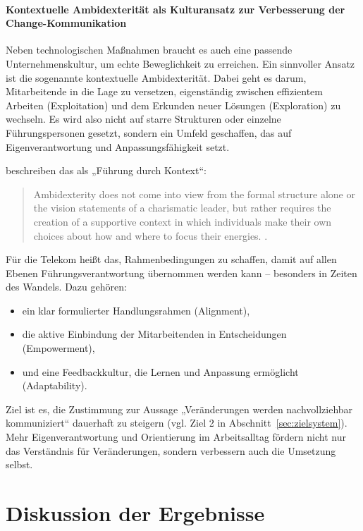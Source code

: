 \documentclass[12pt,a4paper]{article}
\begin{document}
	\paragraph{Kontextuelle Ambidexterität als Kulturansatz zur Verbesserung der Change-Kommunikation}
	
	Neben technologischen Maßnahmen braucht es auch eine passende Unternehmenskultur, um echte Beweglichkeit zu erreichen. Ein sinnvoller Ansatz ist die sogenannte kontextuelle Ambidexterität. Dabei geht es darum, Mitarbeitende in die Lage zu versetzen, eigenständig zwischen effizientem Arbeiten (Exploitation) und dem Erkunden neuer Lösungen (Exploration) zu wechseln. Es wird also nicht auf starre Strukturen oder einzelne Führungspersonen gesetzt, sondern ein Umfeld geschaffen, das auf Eigenverantwortung und Anpassungsfähigkeit setzt.
	
	\noindent\textcite{kumkale_organizational_2022} beschreiben das als „Führung durch Kontext“:
	
	\begin{quote}
		Ambidexterity does not come into view from the formal structure alone or the vision statements of a charismatic leader, but rather requires the creation of a supportive context in which individuals make their own choices about how and where to focus their energies. \parencite[18]{kumkale_organizational_2022}.
	\end{quote}
	
	\noindent Für die Telekom heißt das, Rahmenbedingungen zu schaffen, damit auf allen Ebenen Führungsverantwortung übernommen werden kann – besonders in Zeiten des Wandels. Dazu gehören:
	
	\begin{itemize}
		\item ein klar formulierter Handlungsrahmen (Alignment),
		\item die aktive Einbindung der Mitarbeitenden in Entscheidungen (Empowerment),
		\item und eine Feedbackkultur, die Lernen und Anpassung ermöglicht (Adaptability).
	\end{itemize}
	
	\noindent Ziel ist es, die Zustimmung zur Aussage „Veränderungen werden nachvollziehbar kommuniziert“ dauerhaft zu steigern (vgl. Ziel 2 in Abschnitt~\ref{sec:zielsystem}). Mehr Eigenverantwortung und Orientierung im Arbeitsalltag fördern nicht nur das Verständnis für Veränderungen, sondern verbessern auch die Umsetzung selbst.
	
	
	\section{Diskussion der Ergebnisse}
\end{document}
